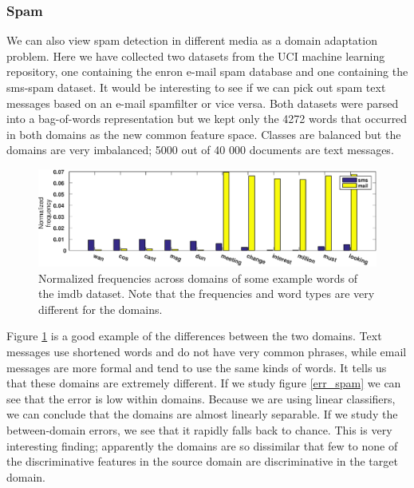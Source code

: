 \documentclass[twoside,11pt]{article}
\begin{document}
\subsubsection{Spam}
We can also view spam detection in different media as a domain adaptation problem. Here we have collected two datasets from the UCI machine learning repository, one containing the enron e-mail spam database and one containing the sms-spam dataset. It would be interesting to see if we can pick out spam text messages based on an e-mail spamfilter or vice versa. Both datasets were parsed into a bag-of-words representation but we kept only the 4272 words that occurred in both domains as the new common feature space. Classes are balanced but the domains are very imbalanced; 5000 out of 40 000 documents are text messages.

\begin{figure}[ht]
	\centering
	\includegraphics[width=1\textwidth]{images/eg_spam.eps}
	\caption{Normalized frequencies across domains of some example words of the imdb dataset. Note that the frequencies and word types are very different for the domains.}
	\label{eg_spam}
\end{figure}

Figure \ref{eg_spam} is a good example of the differences between the two domains. Text messages use shortened words and do not have very common phrases, while email messages are more formal and tend to use the same kinds of words. It tells us that these domains are extremely different. If we study figure \ref{err_spam} we can see that the error is low within domains. Because we are using linear classifiers, we can conclude that the domains are almost linearly separable. If we study the between-domain errors, we see that it rapidly falls back to chance. This is very interesting finding; apparently the domains are so dissimilar that few to none of the discriminative features in the source domain are discriminative in the target domain. 
\end{document}
